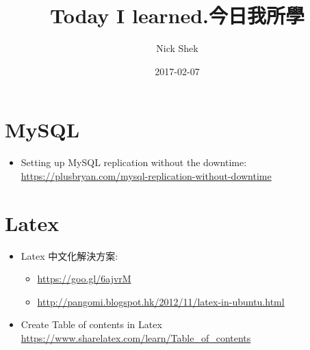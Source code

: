 \documentclass{article}
\title{Today I learned.今日我所學}
\author{Nick Shek}
\date{2017-02-07}
\begin{document}
\maketitle

\clearpage

\tableofcontents

\clearpage

\section{MySQL}

\begin{itemize}
\item Setting up MySQL replication without the downtime: \href{https://plusbryan.com/mysql-replication-without-downtime}{https://plusbryan.com/mysql-replication-without-downtime}
\end{itemize}

\section{Latex}

\begin{itemize}
\item Latex 中文化解決方案:
  \begin{itemize}
    \item \href{https://goo.gl/6ajvrM}{https://goo.gl/6ajvrM}
    \item \href{http://pangomi.blogspot.hk/2012/11/latex-in-ubuntu.html}{http://pangomi.blogspot.hk/2012/11/latex-in-ubuntu.html}
  \end{itemize}
\item Create Table of contents in Latex \href{https://www.sharelatex.com/learn/Table\_of\_contents}{https://www.sharelatex.com/learn/Table\_of\_contents}
\end{itemize}
\end{document}
